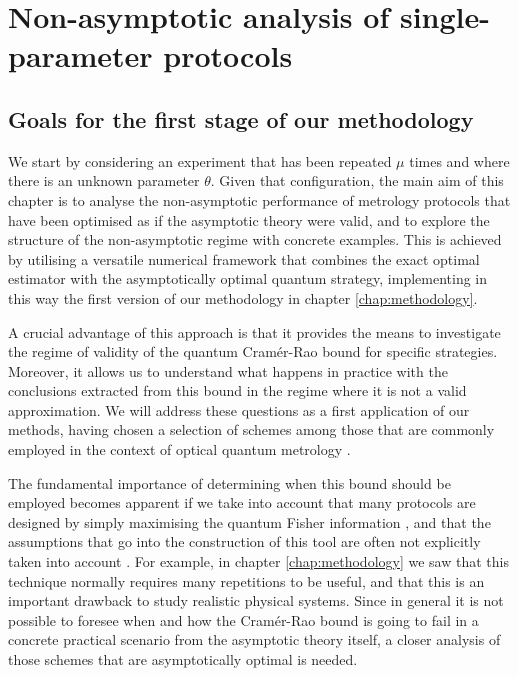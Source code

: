 
\chapter{Non-asymptotic analysis of single-parameter protocols}
\label{chap:nonasymptotic}

\section{Goals for the first stage of our methodology}

We start by considering an experiment that has been repeated $\mu$ times and where there is an unknown parameter $\theta$. Given that configuration, the main aim of this chapter is to analyse the non-asymptotic performance of metrology protocols that have been optimised as if the asymptotic theory were valid, and to explore the structure of the non-asymptotic regime with concrete examples. This is achieved by utilising a versatile numerical framework  that combines the exact optimal estimator with the asymptotically optimal quantum strategy, implementing in this way the first version of our methodology in chapter \ref{chap:methodology}. 

A crucial advantage of this approach is that it provides the means to investigate the regime of validity of the quantum Cram\'{e}r-Rao bound for specific strategies. Moreover, it allows us to understand what happens in practice with the conclusions extracted from this bound in the regime where it is not a valid approximation. We will address these questions as a first application of our methods, having chosen a selection of schemes among those that are commonly employed in the context of optical quantum metrology \cite{yurke1986, berry2000, durkin2007, dowling2008, HofmannHolger2009, gerry2010, chiruvelli2011, rafal2015, PaulProctor2016, dowling2014, sahota2015, sahota2016, lee2016}.

The fundamental importance of determining when this bound should be employed becomes apparent if we take into account that many protocols are designed by simply maximising the quantum Fisher information \cite{rafal2015, PaulProctor2016}, and that the assumptions that go into the construction of this tool are often not explicitly taken into account \cite{PaulProctor2016, proctor2017networked}. For example, in chapter \ref{chap:methodology} we saw that this technique normally requires many repetitions to be useful, and that this is an important drawback to study realistic physical systems. Since in general it is not possible to foresee when and how the Cram\'{e}r-Rao bound is going to fail in a concrete practical scenario from the asymptotic theory itself, a closer analysis of those schemes that are asymptotically optimal is needed. 

